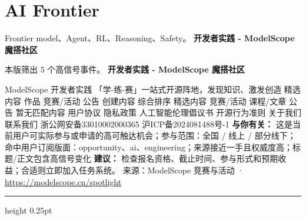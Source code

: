 \documentclass[10.5pt]{ctexart}
\begin{document}
\section*{AI Frontier}
{\color{ormuted} Frontier model、Agent、RL、Reasoning、Safety。}
\vspace{2mm}
{\LARGE\bfseries 开发者实践 - ModelScope 魔搭社区}\par
\vspace{1mm}
{\color{ormuted} 本版筛出 5 个高信号事件。}
\vspace{3mm}
{\Large\bfseries 开发者实践 - ModelScope 魔搭社区}\par
ModelScope 开发者实践 「学-练-赛」一站式开源阵地，发现知识、激发创造 精选内容 作品 竞赛/活动 公告 创建内容 综合排序 精选内容 竞赛/活动 课程/文章 公告 暂无匹配内容 用户协议 隐私政策 人工智能伦理倡议书 开源行为准则 关于我们 联系我们 浙公网安备33010002000365 沪ICP备2024081488号-1
\textbf{与你有关：} 这是当前用户可实际参与或申请的高可触达机会；参与范围：全国 / 线上 / 部分线下；命中用户订阅版面：opportunity、ai、engineering；来源接近一手且权威度高；标题/正文包含高信号变化
\textbf{建议：} 检查报名资格、截止时间、参与形式和预期收益；合适则立即加入任务系统。
{\footnotesize\color{ormuted} 来源：ModelScope 竞赛与活动 · \url{https://modelscope.cn/spotlight}}
\vspace{4mm}
\hrule height 0.25pt
\vspace{3mm}
\end{document}
